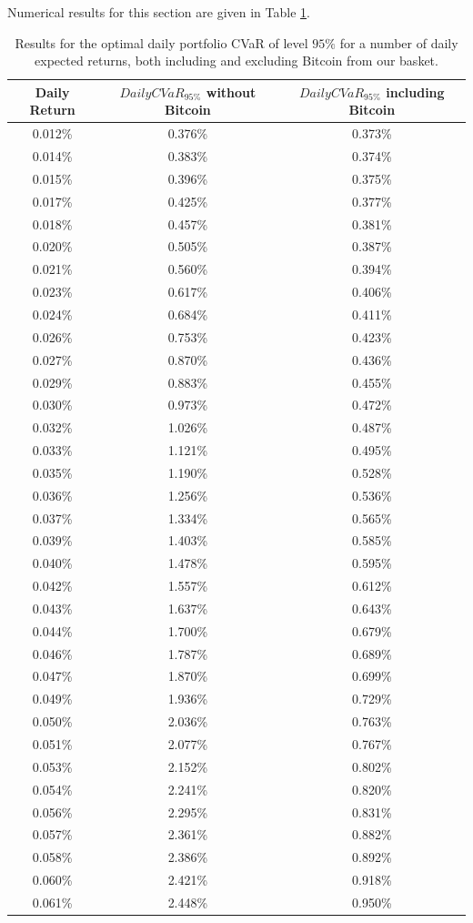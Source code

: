 Numerical results for this section are given in Table \ref{tab:return_cvar}.

\begin{table}
	\small
	\centering
	\caption[CVaR efficient frontier on returns]{Results for the optimal daily portfolio CVaR of level $95\%$ for a number of daily expected returns, both including and excluding Bitcoin from our basket.}
	\label{tab:return_cvar}
\begin{tabular}{ccc}
	
	Daily Return & $DailyCVaR_{95\%}$ without Bitcoin & $DailyCVaR_{95\%}$ including Bitcoin \\
	\midrule
	0.012\% & 0.376\% & 0.373\% \\
	0.014\% & 0.383\% & 0.374\% \\
	0.015\% & 0.396\% & 0.375\% \\
	0.017\% & 0.425\% & 0.377\% \\
	0.018\% & 0.457\% & 0.381\% \\
	0.020\% & 0.505\% & 0.387\% \\
	0.021\% & 0.560\% & 0.394\% \\
	0.023\% & 0.617\% & 0.406\% \\
	0.024\% & 0.684\% & 0.411\% \\
	0.026\% & 0.753\% & 0.423\% \\
	0.027\% & 0.870\% & 0.436\% \\
	0.029\% & 0.883\% & 0.455\% \\
	0.030\% & 0.973\% & 0.472\% \\
	0.032\% & 1.026\% & 0.487\% \\
	0.033\% & 1.121\% & 0.495\% \\
	0.035\% & 1.190\% & 0.528\% \\
	0.036\% & 1.256\% & 0.536\% \\
	0.037\% & 1.334\% & 0.565\% \\
	0.039\% & 1.403\% & 0.585\% \\
	0.040\% & 1.478\% & 0.595\% \\
	0.042\% & 1.557\% & 0.612\% \\
	0.043\% & 1.637\% & 0.643\% \\
	0.044\% & 1.700\% & 0.679\% \\
	0.046\% & 1.787\% & 0.689\% \\
	0.047\% & 1.870\% & 0.699\% \\
	0.049\% & 1.936\% & 0.729\% \\
	0.050\% & 2.036\% & 0.763\% \\
	0.051\% & 2.077\% & 0.767\% \\
	0.053\% & 2.152\% & 0.802\% \\
	0.054\% & 2.241\% & 0.820\% \\
	0.056\% & 2.295\% & 0.831\% \\
	0.057\% & 2.361\% & 0.882\% \\
	0.058\% & 2.386\% & 0.892\% \\
	0.060\% & 2.421\% & 0.918\% \\
	0.061\% & 2.448\% & 0.950\% \\
	\midrule
\end{tabular}

\end{table}

